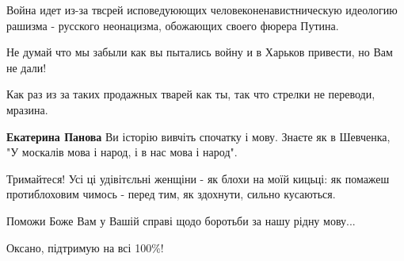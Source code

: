 \begin{itemize}
\begin{itemize}
Война идет из-за твсрей исповедуюющих человеконенавистническую идеологию
рашизма - русского неонацизма, обожающих своего фюрера Путина.

Не думай что мы забыли как вы пытались войну и в Харьков привести, но Вам не
дали!

 
Как раз из за таких продажных тварей как ты, так что стрелки не переводи, мразина.

 
\textbf{Екатерина Панова} Ви історію вивчіть спочатку і мову. Знаєте як в
Шевченка, "У москалів мова і народ, і в нас мова і народ".

\end{itemize}

 

Тримайтеся! Усі ці удівітєльні женщіни - як блохи на моїй кицьці: як помажеш
протиблоховим чимось - перед тим, як здохнути, сильно кусаються.


 
Поможи Боже Вам у Вашій справі щодо боротьби за нашу рідну мову...

 
Оксано, підтримую на всі 100\%!

 

\end{itemize}
